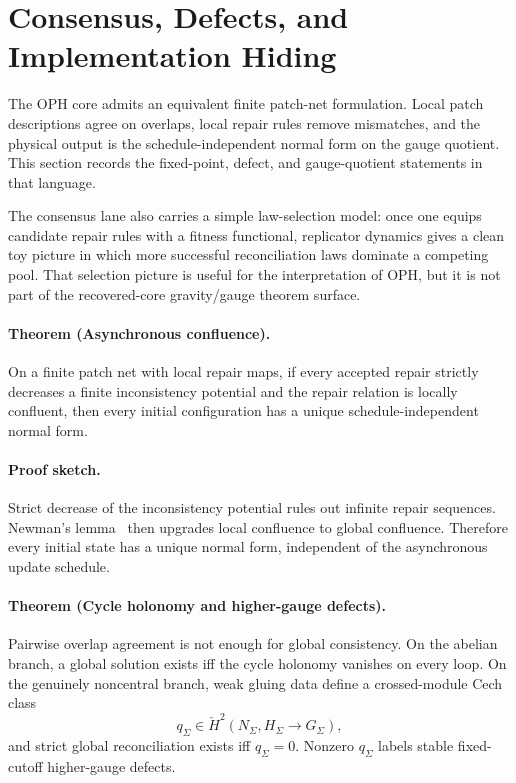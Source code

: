 \section{Consensus, Defects, and Implementation Hiding}

The OPH core admits an equivalent finite patch-net formulation. Local patch descriptions agree on
overlaps, local repair rules remove mismatches, and the physical output is the
schedule-independent normal form on the gauge quotient. This section records the fixed-point,
defect, and gauge-quotient statements in that language.

The consensus lane also carries a simple law-selection model: once one equips candidate repair
rules with a fitness functional, replicator dynamics gives a clean toy picture in which more
successful reconciliation laws dominate a competing pool. That selection picture is useful for the
interpretation of OPH, but it is not part of the recovered-core gravity/gauge theorem surface.

\paragraph{Theorem (Asynchronous confluence).}
On a finite patch net with local repair maps, if every accepted repair strictly decreases a
finite inconsistency potential and the repair relation is locally confluent, then every initial
configuration has a unique schedule-independent normal form.

\paragraph{Proof sketch.}
Strict decrease of the inconsistency potential rules out infinite repair sequences. Newman's
lemma~\cite{newman42} then upgrades local confluence to global confluence. Therefore every initial state has a
unique normal form, independent of the asynchronous update schedule.

\paragraph{Theorem (Cycle holonomy and higher-gauge defects).}
Pairwise overlap agreement is not enough for global consistency. On the abelian branch, a global
solution exists iff the cycle holonomy vanishes on every loop. On the genuinely noncentral
branch, weak gluing data define a crossed-module Cech class
\[
q_\Sigma \in \check H^2(N_\Sigma,H_\Sigma \to G_\Sigma),
\]
and strict global reconciliation exists iff \(q_\Sigma=0\). Nonzero \(q_\Sigma\) labels stable
fixed-cutoff higher-gauge defects.

